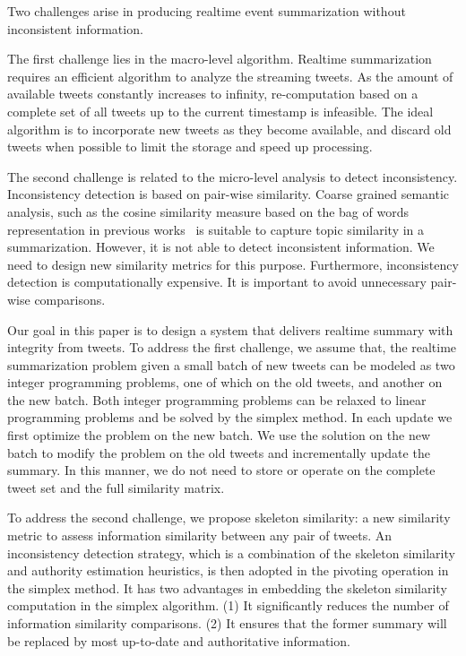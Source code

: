 \documentclass[envcountsame]{llncs}
\begin{document}
Two challenges arise in producing realtime event summarization without inconsistent information.

The first challenge lies in the macro-level algorithm. Realtime summarization requires an efficient algorithm to analyze the streaming tweets. As the amount of available tweets constantly increases to infinity, re-computation based on a complete set of all tweets up to the current timestamp is infeasible. The ideal algorithm is to  incorporate new tweets as they become available, and discard old tweets when possible to limit the storage and speed up processing.

The second challenge is related to the micro-level analysis to detect inconsistency. Inconsistency detection is based on pair-wise similarity. Coarse grained semantic analysis, such as the cosine similarity measure based on the bag of words representation in previous works~\cite{Takamura2011Summarizing,Lin2012Generating,Rudra2015Extracting,Shou2013Sumblr,Liu2016LEDS,Gillani2017Post,Zubiaga2012Towards,Sharifi2010Summarizing} is suitable to capture topic similarity in a summarization. However, it is not able to detect inconsistent information. We need to design new similarity metrics for this purpose. Furthermore, inconsistency detection is computationally expensive. It is important to avoid unnecessary pair-wise comparisons.

Our goal in this paper is to design a system that delivers realtime summary with integrity from tweets. To address the first challenge, we assume that, the realtime summarization problem given a small batch of new tweets can be modeled as two integer programming problems, one of which on the old tweets, and another on the new batch. Both integer programming problems can be relaxed to linear programming problems and be solved by the simplex method. In each update we first optimize the problem on the new batch. We use the solution on the new batch to modify the problem on the old tweets and incrementally update the summary.  In this manner, we do not need to store or operate on the complete tweet set and the full similarity matrix.

To address the second challenge, we propose skeleton similarity: a new similarity metric to assess information similarity between any pair of tweets. An inconsistency detection strategy, which is a combination of the skeleton similarity and authority estimation heuristics, is then adopted in the pivoting operation in the simplex method. It has two advantages in embedding the skeleton similarity computation in the simplex algorithm. (1) It significantly reduces the number of information similarity comparisons. (2) It ensures that the former summary will be replaced by most up-to-date and authoritative information.
\end{document}
